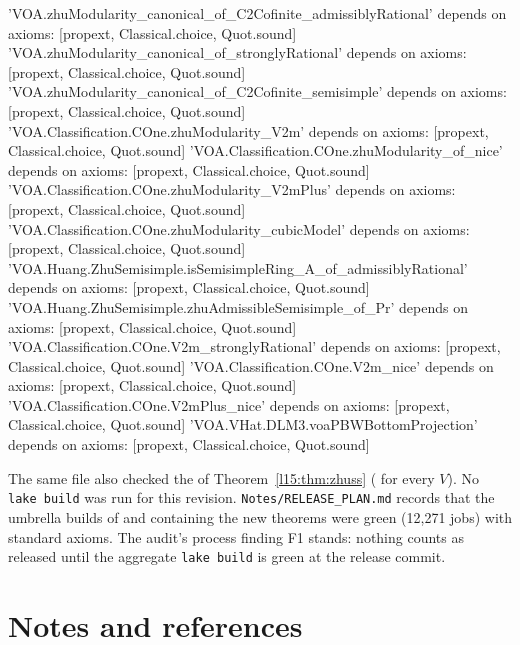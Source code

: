 \begin{plaincode}
'VOA.zhuModularity_canonical_of_C2Cofinite_admissiblyRational' depends on axioms: [propext,
 Classical.choice,
 Quot.sound]
'VOA.zhuModularity_canonical_of_stronglyRational' depends on axioms: [propext, Classical.choice, Quot.sound]
'VOA.zhuModularity_canonical_of_C2Cofinite_semisimple' depends on axioms: [propext, Classical.choice, Quot.sound]
'VOA.Classification.COne.zhuModularity_V2m' depends on axioms: [propext, Classical.choice, Quot.sound]
'VOA.Classification.COne.zhuModularity_of_nice' depends on axioms: [propext, Classical.choice, Quot.sound]
'VOA.Classification.COne.zhuModularity_V2mPlus' depends on axioms: [propext, Classical.choice, Quot.sound]
'VOA.Classification.COne.zhuModularity_cubicModel' depends on axioms: [propext, Classical.choice, Quot.sound]
'VOA.Huang.ZhuSemisimple.isSemisimpleRing_A_of_admissiblyRational' depends on axioms: [propext,
 Classical.choice,
 Quot.sound]
'VOA.Huang.ZhuSemisimple.zhuAdmissibleSemisimple_of_Pr' depends on axioms: [propext, Classical.choice, Quot.sound]
'VOA.Classification.COne.V2m_stronglyRational' depends on axioms: [propext, Classical.choice, Quot.sound]
'VOA.Classification.COne.V2m_nice' depends on axioms: [propext, Classical.choice, Quot.sound]
'VOA.Classification.COne.V2mPlus_nice' depends on axioms: [propext, Classical.choice, Quot.sound]
'VOA.VHat.DLM3.voaPBWBottomProjection' depends on axioms: [propext, Classical.choice, Quot.sound]
\end{plaincode}
The same file also checked the  of Theorem~\ref{l15:thm:zhuss} ( for every $V$).
No \texttt{lake build} was run for this revision. \texttt{Notes/RELEASE\_PLAN.md} records that the umbrella builds of
 and  containing the new theorems were green (12,271 jobs) with standard axioms.
The audit's process finding F1 stands: nothing counts as released until the aggregate \texttt{lake build} is green at the
release commit.

\section{Notes and references}\label{l15:sec:notes}


